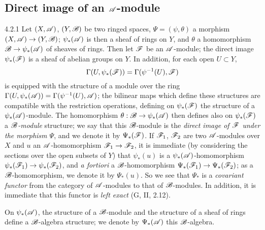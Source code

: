 \subsection{Direct image of an $\mathscr{A}$-module}
\label{0-prelim-4.2}

\begin{env}{4.2.1}
\label{env-0.4.2.1}
Let $(X,\mathscr{A})$, $(Y,\mathscr{B})$ be two ringed spaces, $\Psi=(\psi,\theta)$ a
morphism $(X,\mathscr{A})\to(Y,\mathscr{B})$; $\psi_*(\mathscr{A})$ is then a sheaf of rings on
$Y$, and $\theta$ a homomorphism $\mathscr{B}\to\psi_*(\mathscr{A})$ of sheaves of rings.
Then let $\mathscr{F}$ be an $\mathscr{A}$-module; the direct image $\psi_*(\mathscr{F})$ is a
sheaf of abelian groups on $Y$. In addition, for each open $U\subset Y$,
\[
  \Gamma(U,\psi_*(\mathscr{F}))=\Gamma(\psi^{-1}(U),\mathscr{F})
\]
is equipped with the structure of a module over the ring
$\Gamma(U,\psi_*(\mathscr{A}))=\Gamma(\psi^{-1}(U),\mathscr{A})$; the bilinear maps which
define these structures are compatible with the restriction operations, defining
on $\psi_*(\mathscr{F})$ the structure of a $\psi_*(\mathscr{A})$-module. The homomorphism
$\theta:\mathscr{B}\to\psi_*(\mathscr{A})$ then defines also on $\psi_*(\mathscr{F})$ a
\emph{$\mathscr{B}$-module} structure; we say that this
$\mathscr{B}$-module is the \emph{direct image of $\mathscr{F}$ under the morphism
$\Psi$}, and we denote it by $\Psi_*(\mathscr{F})$. If $\mathscr{F}_1$, $\mathscr{F}_2$ are two
$\mathscr{A}$-modules over $X$ and $u$ an $\mathscr{A}$-homomorphism
$\mathscr{F}_1\to\mathscr{F}_2$, it is immediate (by considering the sections over the
open subsets of $Y$) that $\psi_*(u)$ is a $\psi_*(\mathscr{A})$-homomorphism
$\psi_*(\mathscr{F}_1)\to\psi_*(\mathscr{F}_2)$, and \emph{a fortiori} a
$\mathscr{B}$-homomorphism $\Psi_*(\mathscr{F}_1)\to\Psi_*(\mathscr{F}_2)$; as a
$\mathscr{B}$-homomorphism, we denote it by $\Psi_*(u)$. So we see that $\Psi_*$ is a
\emph{covariant functor} from the category of $\mathscr{A}$-modules to that of
$\mathscr{B}$-modules. In addition, it is immediate that this functor is \emph{left
exact} (G, II, 2.12).

On $\psi_*(\mathscr{A})$, the structure of a $\mathscr{B}$-module and the structure of a
sheaf of rings define a $\mathscr{B}$-algebra structure; we denote by
$\Psi_*(\mathscr{A})$ this $\mathscr{B}$-algebra.
\end{env}

